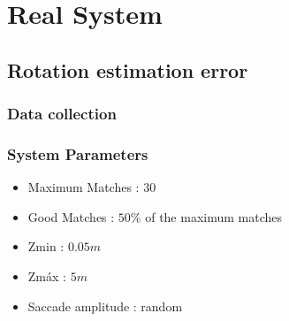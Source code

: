 \section{Real System}
\subsection{Rotation estimation error}
\subsubsection{Data collection}
\subsubsection{System Parameters}
\begin{itemize}
	\item Maximum Matches : $30$
	\item Good Matches : $50 \%$ of the maximum matches
	\item Zmin : $0.05 m$
	\item Zmáx : $5 m$
	\item Saccade amplitude : random
\end{itemize}
